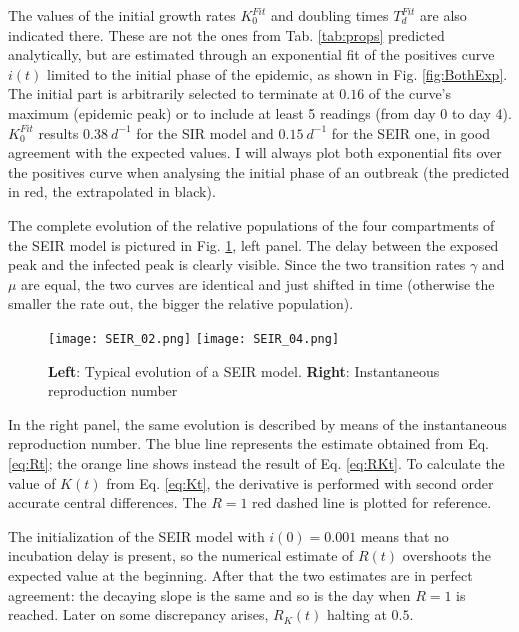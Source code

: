 \documentclass[DIV=12, BCOR=0pt]{scrartcl}  %
\begin{document}
	

	The values of the initial growth rates $K_0^{Fit}$ and doubling times $T_d^{Fit}$ are also indicated there. These are not the ones from Tab. \ref{tab:props} predicted analytically, but are estimated through an exponential fit of the positives curve $i(t)$ limited to the initial phase of the epidemic, as shown in Fig. \ref{fig:BothExp}. 
	The initial part is arbitrarily selected to terminate at $0.16$ of the curve's maximum (epidemic peak) or to include at least 5 readings (from day 0 to day 4). 
	$K_0^{Fit}$ results $0.38 \ d^{-1}$ for the SIR model and  $0.15 \ d^{-1}$ for the SEIR one, in good agreement with the expected values. I will always plot both exponential fits over the positives curve when analysing the initial phase of an outbreak (the predicted in red, the extrapolated in black). 
	
	The complete evolution of the relative populations of the four compartments of the SEIR model is pictured in Fig. \ref{fig:SEIRboth}, left panel. The delay between the exposed peak and the infected peak is clearly visible. Since the two transition rates $\gamma$ and $\mu$ are equal, the two curves are identical and just shifted in time (otherwise the smaller the rate out, the bigger the relative population). %
	\begin{figure}[h!]
		\centering
		\texttt{[image: SEIR\_02.png]}
		\texttt{[image: SEIR\_04.png]}
		\caption{\textbf{Left}: Typical evolution of a SEIR model. \textbf{Right}: Instantaneous reproduction number }
		\label{fig:SEIRboth}
	\end{figure}
	 
	In the right panel, the same evolution is described by means of the instantaneous reproduction number. The blue line represents the estimate obtained from Eq. \ref{eq:Rt}; the orange line shows instead the result of Eq. \ref{eq:RKt}.
	To calculate the value of $K(t)$ from Eq. \ref{eq:Kt}, the derivative is performed with second order accurate central differences. The $R = 1$ red dashed line is plotted for reference.
	
  The initialization of the SEIR model with $i(0) = 0.001$ means that no incubation delay is present, so the numerical estimate of $R(t)$ overshoots the expected value at the beginning. After that the two estimates are in perfect agreement: the decaying slope is the same and so is the day when $R = 1$ is reached. Later on some discrepancy arises, $R_K(t)$ halting at $0.5$.\\
\end{document}
